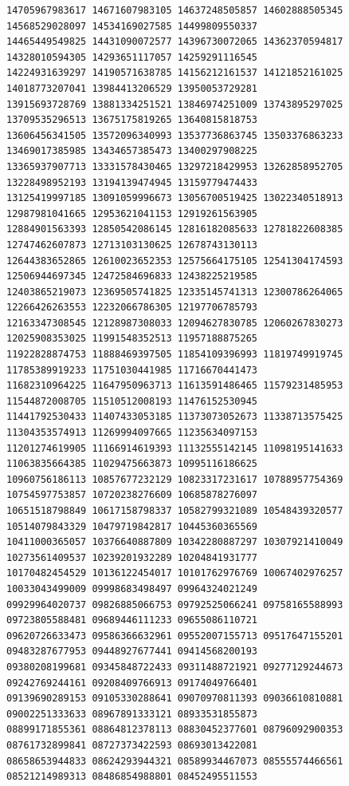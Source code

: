 \documentclass[10pt]{article}
\begin{document}
\begin{verbatim}
14705967983617 14671607983105 14637248505857 14602888505345 14568529028097 14534169027585 14499809550337
14465449549825 14431090072577 14396730072065 14362370594817 14328010594305 14293651117057 14259291116545
14224931639297 14190571638785 14156212161537 14121852161025 14018773207041 13984413206529 13950053729281
13915693728769 13881334251521 13846974251009 13743895297025 13709535296513 13675175819265 13640815818753
13606456341505 13572096340993 13537736863745 13503376863233 13469017385985 13434657385473 13400297908225
13365937907713 13331578430465 13297218429953 13262858952705 13228498952193 13194139474945 13159779474433
13125419997185 13091059996673 13056700519425 13022340518913 12987981041665 12953621041153 12919261563905
12884901563393 12850542086145 12816182085633 12781822608385 12747462607873 12713103130625 12678743130113
12644383652865 12610023652353 12575664175105 12541304174593 12506944697345 12472584696833 12438225219585
12403865219073 12369505741825 12335145741313 12300786264065 12266426263553 12232066786305 12197706785793
12163347308545 12128987308033 12094627830785 12060267830273 12025908353025 11991548352513 11957188875265
11922828874753 11888469397505 11854109396993 11819749919745 11785389919233 11751030441985 11716670441473
11682310964225 11647950963713 11613591486465 11579231485953 11544872008705 11510512008193 11476152530945
11441792530433 11407433053185 11373073052673 11338713575425 11304353574913 11269994097665 11235634097153
11201274619905 11166914619393 11132555142145 11098195141633 11063835664385 11029475663873 10995116186625
10960756186113 10857677232129 10823317231617 10788957754369 10754597753857 10720238276609 10685878276097
10651518798849 10617158798337 10582799321089 10548439320577 10514079843329 10479719842817 10445360365569
10411000365057 10376640887809 10342280887297 10307921410049 10273561409537 10239201932289 10204841931777
10170482454529 10136122454017 10101762976769 10067402976257 10033043499009 09998683498497 09964324021249
09929964020737 09826885066753 09792525066241 09758165588993 09723805588481 09689446111233 09655086110721
09620726633473 09586366632961 09552007155713 09517647155201 09483287677953 09448927677441 09414568200193
09380208199681 09345848722433 09311488721921 09277129244673 09242769244161 09208409766913 09174049766401
09139690289153 09105330288641 09070970811393 09036610810881 09002251333633 08967891333121 08933531855873
08899171855361 08864812378113 08830452377601 08796092900353 08761732899841 08727373422593 08693013422081
08658653944833 08624293944321 08589934467073 08555574466561 08521214989313 08486854988801 08452495511553

\end{verbatim}
\end{document}
